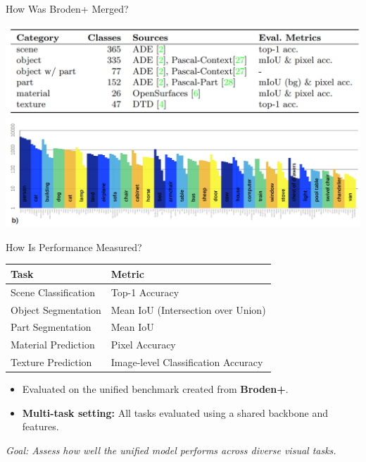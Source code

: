 \documentclass{beamer}
\begin{document}
\begin{frame}{How Was Broden+ Merged?}
  \begin{center}
    \includegraphics[width=0.8\linewidth]{Images/BrodenDataset.png}
    \includegraphics[width=0.8\linewidth]{Images/ObjectClasses.png}
  \end{center}
\end{frame}


\begin{frame}{How Is Performance Measured?}
  \vspace{0.4cm}
  \begin{tabular}{ll}
    \textbf{Task} & \textbf{Metric} \\
    \hline
    Scene Classification & Top-1 Accuracy \\
    Object Segmentation & Mean IoU (Intersection over Union) \\
    Part Segmentation & Mean IoU \\
    Material Prediction & Pixel Accuracy \\
    Texture Prediction & Image-level Classification Accuracy \\
  \end{tabular}
  \vspace{0.5cm}
  \begin{itemize}
    \item Evaluated on the unified benchmark created from \textbf{Broden+}.
    \item \textbf{Multi-task setting:} All tasks evaluated using a shared backbone and features.
  \end{itemize}
  \vfill
  \textit{Goal: Assess how well the unified model performs across diverse visual tasks.}
\end{frame}
\end{document}

